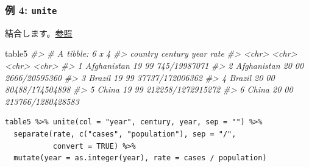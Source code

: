 \documentclass[
  xelatex, ja=standard]{bxjsbook}
\newenvironment{Shaded}{\begin{snugshade}}{\end{snugshade}}
\newcommand{\CommentTok}[1]{\textcolor[rgb]{0.56,0.35,0.01}{\textit{#1}}}
\newcommand{\NormalTok}[1]{#1}
\theoremstyle{definition}
\theoremstyle{definition}
\theoremstyle{definition}
\theoremstyle{definition}
\theoremstyle{remark}
\begin{document}
\hypertarget{ux4f8b-4-unite}{%
\subsubsection{\texorpdfstring{例 4: \texttt{unite}}{例 4: unite}}\label{ux4f8b-4-unite}}

結合します。\href{https://tidyr.tidyverse.org/reference/unite.html}{参照}

\begin{Shaded}
\begin{Highlighting}[]
\NormalTok{table5}
\CommentTok{\#\textgreater{} \# A tibble: 6 x 4}
\CommentTok{\#\textgreater{}   country     century year  rate             }
\CommentTok{\#\textgreater{}   \textless{}chr\textgreater{}       \textless{}chr\textgreater{}   \textless{}chr\textgreater{} \textless{}chr\textgreater{}            }
\CommentTok{\#\textgreater{} 1 Afghanistan 19      99    745/19987071     }
\CommentTok{\#\textgreater{} 2 Afghanistan 20      00    2666/20595360    }
\CommentTok{\#\textgreater{} 3 Brazil      19      99    37737/172006362  }
\CommentTok{\#\textgreater{} 4 Brazil      20      00    80488/174504898  }
\CommentTok{\#\textgreater{} 5 China       19      99    212258/1272915272}
\CommentTok{\#\textgreater{} 6 China       20      00    213766/1280428583}
\end{Highlighting}
\end{Shaded}

\begin{verbatim}
table5 %>% unite(col = "year", century, year, sep = "") %>%
  separate(rate, c("cases", "population"), sep = "/", 
           convert = TRUE) %>%
  mutate(year = as.integer(year), rate = cases / population)
\end{verbatim}
\end{document}
